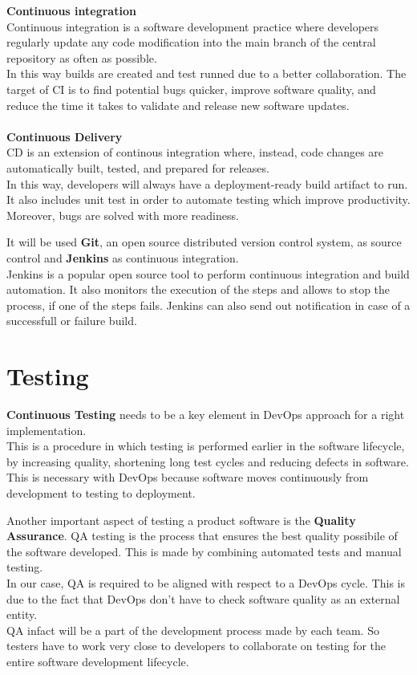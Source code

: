 \textbf{Continuous integration}\\
Continuous integration is a software development practice where developers regularly update any code modification into the main branch of the central repository as often as possible.\\ 
In this way builds are created and test runned due to a better collaboration. The target of CI is to find potential bugs quicker, improve software quality, and reduce the time it takes to validate and release new software updates.\\
\medskip
\\
\textbf{Continuous Delivery}\\
CD is an extension of continous integration where, instead, code changes are automatically built, tested, and prepared for releases.\\ 
In this way, developers will always have a deployment-ready build artifact to run. It also includes unit test in order to automate testing which improve productivity. Moreover, bugs are solved with more readiness.
\par

It will be used \textbf{Git}, an open source distributed version control system, as source control and \textbf{Jenkins} as continuous integration.\\
Jenkins is a popular open source tool to perform continuous integration and build automation.
It also monitors the execution of the steps and allows to stop the process, if one of the steps fails. Jenkins can also send out notification in case of a successfull or failure build.

 
\section{Testing}

\textbf{Continuous Testing} needs to be a key element in DevOps approach for a right implementation. \\
This is a procedure in which testing is performed earlier in the software lifecycle, by increasing quality, shortening long test cycles and reducing defects in software.\\
This is necessary with DevOps because software moves continuously from development to testing to deployment.
\par
Another important aspect of testing a product software is the \textbf{Quality Assurance}.
QA testing is the process that ensures the best quality possibile of the software developed. This is made by combining automated tests and manual testing.\\ 
In our case, QA is required to be aligned with respect to a DevOps cycle.
This is due to the fact that DevOps don't have to check software quality as an external entity.\\
QA infact will be a part of the development process made by each team. 
So testers have to work very close to developers to collaborate on testing for the entire software development lifecycle.














